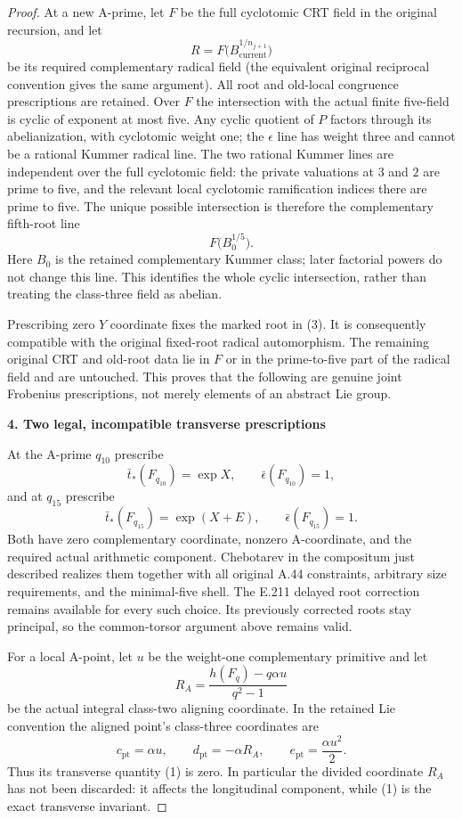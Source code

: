 \begin{proof}
At a new A-prime, let $F$ be the full cyclotomic CRT field in the original recursion, and let
\[
 R=F\bigl(B_{\mathrm{current}}^{1/n_{j+1}}\bigr)
\]
be its required complementary radical field (the equivalent original reciprocal convention gives the same argument). All root and old-local congruence prescriptions are retained. Over $F$ the intersection with the actual finite five-field is cyclic of exponent at most five. Any cyclic quotient of $P$ factors through its abelianization, with cyclotomic weight one; the $\epsilon$ line has weight three and cannot be a rational Kummer radical line. The two rational Kummer lines are independent over the full cyclotomic field: the private valuations at $3$ and $2$ are prime to five, and the relevant local cyclotomic ramification indices there are prime to five. The unique possible intersection is therefore the complementary fifth-root line
\[
 F\bigl(B_0^{1/5}\bigr).
 \tag{3}
\]
Here $B_0$ is the retained complementary Kummer class; later factorial powers do not change this line. This identifies the whole cyclic intersection, rather than treating the class-three field as abelian.

Prescribing zero $Y$ coordinate fixes the marked root in (3). It is consequently compatible with the original fixed-root radical automorphism. The remaining original CRT and old-root data lie in $F$ or in the prime-to-five part of the radical field and are untouched. This proves that the following are genuine joint Frobenius prescriptions, not merely elements of an abstract Lie group.

\par\medskip\noindent\textbf{4. Two legal, incompatible transverse prescriptions}\par\nobreak\smallskip
At the A-prime $q_{10}$ prescribe
\[
 \bar t_*(F_{q_{10}})=\exp X,\qquad
 \bar\epsilon(F_{q_{10}})=1,
\]
and at $q_{15}$ prescribe
\[
 \bar t_*(F_{q_{15}})=\exp(X+E),\qquad
 \bar\epsilon(F_{q_{15}})=1.
 \tag{4}
\]
Both have zero complementary coordinate, nonzero A-coordinate, and the required actual arithmetic component. Chebotarev in the compositum just described realizes them together with all original A.44 constraints, arbitrary size requirements, and the minimal-five shell. The E.211 delayed root correction remains available for every such choice. Its previously corrected roots stay principal, so the common-torsor argument above remains valid.

For a local A-point, let $u$ be the weight-one complementary primitive and let
\[
 R_A=\frac{h(F_q)-q\alpha u}{q^2-1}
\]
be the actual integral class-two aligning coordinate. In the retained Lie convention the aligned point's class-three coordinates are
\[
 c_{\mathrm{pt}}=\alpha u,\qquad
 d_{\mathrm{pt}}=-\alpha R_A,\qquad
 e_{\mathrm{pt}}=\frac{\alpha u^2}{2}.
 \tag{5}
\]
Thus its transverse quantity (1) is zero. In particular the divided coordinate $R_A$ has not been discarded: it affects the longitudinal component, while (1) is the exact transverse invariant.


\end{proof}
